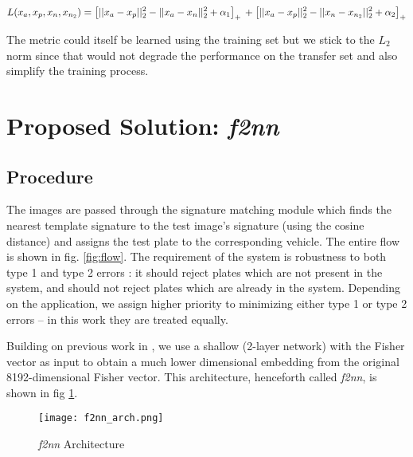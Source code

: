 \documentclass[10pt,twocolumn,letterpaper]{article}
\begin{document}
            \begin{dmath}\label{eq:quad}
            L(x_a, x_p, x_n, x_{n_2}) =
                \left[||x_a - x_p||_2^2 - ||x_a - x_n||_2^2 + \alpha_1\right]_+ \\
                + \left[||x_a - x_p||_2^2 - ||x_n - x_{n_2}||_2^2 + \alpha_2\right]_+
            \end{dmath}

            The metric could itself be learned using the training set but we stick to the $L_2$ norm since that would not degrade the performance on the transfer set and also simplify the training process.

\section{Proposed Solution: \emph{f2nn} \label{sec:f2nn}}
    \subsection{Procedure}\label{sec:f2nn:procedure}
    The images are passed through the signature matching module which finds the nearest template signature to the test image's signature (using the cosine distance) and assigns the test plate to the corresponding vehicle. The entire flow is shown in fig. \ref{fig:flow}. The requirement of the system is robustness to both type 1 and type 2 errors : it should reject plates which are not present in the system, and should not reject plates which are already in the system. Depending on the application, we assign higher priority to minimizing either type 1 or type 2 errors -- in this work they are treated equally.


    Building on previous work in \cite{PerronninLarlusCVPR15}, we use a shallow (2-layer network) with the Fisher vector as input to obtain a much lower dimensional embedding from the original 8192-dimensional Fisher vector. This architecture, henceforth called \emph{f2nn}, is shown in fig \ref{fig:f2nn_arch}.
    \begin{figure}[!t]
    \begin{center}
        \texttt{[image: f2nn\_arch.png]}
        \caption{\emph{f2nn} Architecture}
        \label{fig:f2nn_arch}
    \end{center}
    \end{figure}
\end{document}
